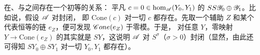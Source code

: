 \begin{remark}\label{thm:cone-shift-sum-relation}
在\trDirectSum、\trSuspension{}与\trMappingCone{}之间存在一个初等的关系：
平凡\trMorphism{} $c=0\in\hom_{\mathscr{A}}(Y_0,Y_1)$ 的\trCone{}\trQuasiRepresent
$SS\mathscr{Y}_0\oplus\mathscr{Y}_1$。比如说，假设 $\mathscr{A}$ 对\trMappingCone{}封闭，
即 $\mathrm{Cone}(c)$ 对一切 $c$ 都存在。先取一个辅助\trObject{} $Z$ 和某个
代表恒等的链 $e_Z$，便可发现 $\mathscr{C}one(e_Z)$ \trIsomorphic{}于零模。于是，
对任意 $Y$，零映射 $Y\to\mathrm{Cone}(e_Z)$ 的\trCone{}其实就是 $SY$，这说明
$\mathscr{A}$ 对\trSuspension{} $S^{\sigma}$（$\sigma>0$）封闭（显然，由此还可得知
$SY_0\oplus SY_1$ 对一切 $Y_0,Y_1$ 都存在）。
\end{remark}
